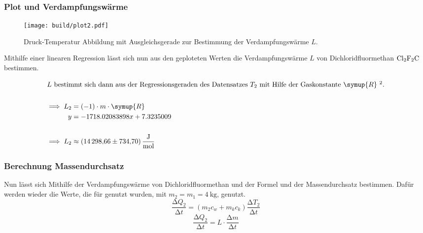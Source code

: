 \subsubsection{Plot und Verdampfungswärme}

\begin{figure}
    \centering
    \texttt{[image: build/plot2.pdf]}
    \caption{Druck-Temperatur Abbildung mit Ausgleichsgerade zur Bestimmung der Verdampfungswärme $L$.}
\end{figure}

Mithilfe einer linearen Regression lässt sich nun aus den geploteten Werten 
die Verdampfungswärme $L$ von Dichloridfluormethan $\ce{Cl2F2C}$ bestimmen.

\begin{align*}
\intertext{$L$ bestimmt sich dann aus der Regressionsgeraden des Datensatzes $T_2$
 mit Hilfe der Gaskonstante $\symup{R}$ \footnotemark[2].}
\\
\implies L_2&=(-1) \cdot m \cdot \symup{R}\\
y&=-1718.02083898x+7.3235009\\
\\
\implies L_2&\approx\SI{14298.66+-734.7}{\joule\per\mol}
\end{align*}



\subsubsection{Berechnung Massendurchsatz}

Nun lässt sich Mithilfe der Verdampfungswärme von Dichloridfluormethan und der Formel  und  der Massendurchsatz bestimmen.
Dafür werden wieder die Werte, die für  genutzt wurden, mit $m_2= m_1= \SI{4}{\kilo\gram}$, genutzt.
\begin{equation}
    \frac{\increment Q_2}{\increment t} = \left(m_2 c_w + m_k c_k \right)\frac{\increment T_2}{\increment t}
    \label{eqn:delQ2}
\end{equation}
\begin{equation}
    \frac{\increment Q_2}{\increment t} = L\cdot \frac{\increment m}{\increment t}
    \label{eqn:mass}
\end{equation}

